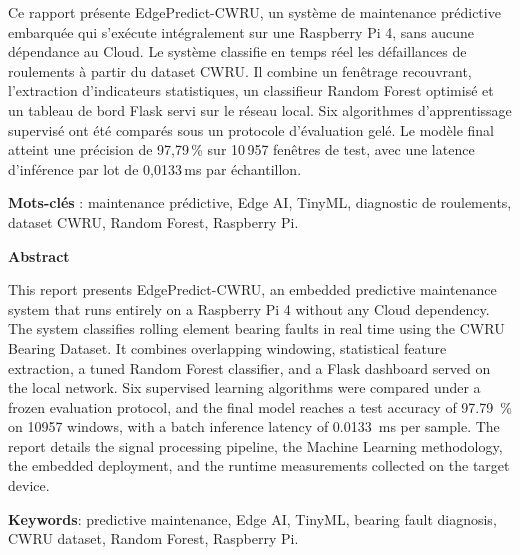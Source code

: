 \documentclass[11pt,a4paper,oneside]{report}
\numberwithin{figure}{chapter}
\numberwithin{table}{chapter}
\numberwithin{equation}{chapter}
\begin{document}
	\noindent
	Ce rapport présente EdgePredict-CWRU, un système de maintenance prédictive embarquée qui s'exécute intégralement sur une Raspberry Pi 4, sans aucune dépendance au Cloud. Le système classifie en temps réel les défaillances de roulements à partir du dataset CWRU. Il combine un fenêtrage recouvrant, l'extraction d'indicateurs statistiques, un classifieur Random Forest optimisé et un tableau de bord Flask servi sur le réseau local. Six algorithmes d'apprentissage supervisé ont été comparés sous un protocole d'évaluation gelé. Le modèle final atteint une précision de 97,79\,\% sur 10\,957 fenêtres de test, avec une latence d'inférence par lot de 0,0133\,ms par échantillon.
	
	\vspace{0.9em}
	\noindent\textbf{Mots-clés} : maintenance prédictive, Edge AI, TinyML, diagnostic de roulements, dataset CWRU, Random Forest, Raspberry Pi.
	
	\vspace{2.5em}
	
	{\sffamily\bfseries\LARGE Abstract\par}
	\vspace{0.9em}
	
	\noindent
	This report presents EdgePredict-CWRU, an embedded predictive maintenance system that runs entirely on a Raspberry Pi 4 without any Cloud dependency. The system classifies rolling element bearing faults in real time using the CWRU Bearing Dataset. It combines overlapping windowing, statistical feature extraction, a tuned Random Forest classifier, and a Flask dashboard served on the local network. Six supervised learning algorithms were compared under a frozen evaluation protocol, and the final model reaches a test accuracy of \SI{97.79}{\percent} on \num{10957} windows, with a batch inference latency of \SI{0.0133}{\milli\second} per sample. The report details the signal processing pipeline, the Machine Learning methodology, the embedded deployment, and the runtime measurements collected on the target device.
	
	\vspace{0.9em}
	\noindent\textbf{Keywords}: predictive maintenance, Edge AI, TinyML, bearing fault diagnosis, CWRU dataset, Random Forest, Raspberry Pi.

	\cleardoublepage
	\tableofcontents
	
	\cleardoublepage
	\listoffigures
	
\end{document}
